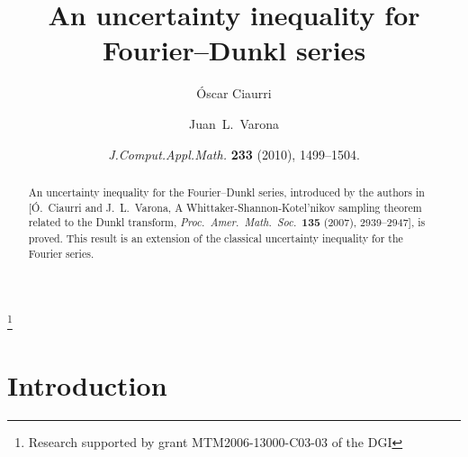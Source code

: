 \documentclass[a4paper]{amsart}
\theoremstyle{plain}
\theoremstyle{definition}
\begin{document}

\title[An uncertainty inequality for Fourier--Dunkl series]{An uncertainty 
inequality for Fourier--Dunkl series}

\author[\'O. Ciaurri]{\'Oscar Ciaurri}
\address{Departamento de Matem\'aticas y Computaci\'on,
Universidad de La Rioja, Edificio J.~L.~Vives,
Calle Luis de Ulloa s/n, 26004 Logro\~no, Spain}

\author[J. L. Varona]{Juan~L.~Varona}
\address{Departamento de Matem\'aticas y Computaci\'on,
Universidad de La Rioja, Edificio J.~L.~Vives,
Calle Luis de Ulloa s/n, 26004 Logro\~no, Spain}
\thanks{Research supported by grant MTM2006-13000-C03-03 of the DGI}



\renewcommand\datename{\textbf{THIS PAPER HAS BEEN PUBLISHED IN}}
\date{\textit{J.\@ Comput.\@ Appl.\@ Math.\@} \textbf{233} (2010), 1499--1504.}

\begin{abstract}
An uncertainty inequality for the Fourier--Dunkl series, introduced by the authors in 
[\'O.~Ciaurri and J.~L.~Varona,
{A Whittaker-Shannon-Kotel'nikov sampling theorem related to the Dunkl transform,}
\textit{Proc.\ Amer.\ Math.\ Soc.}\ \textbf{135} (2007), 2939--2947], is proved. 
This result is an extension of the classical uncertainty inequality for the Fourier series.
\end{abstract}

\maketitle

\section{Introduction}
\end{document}
